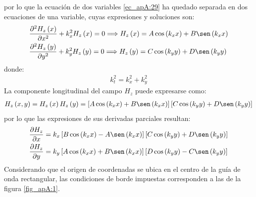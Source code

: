 por lo que la ecuación de dos variables \eqref{ec_apA:29} ha quedado separada en dos ecuaciones de una variable, cuyas expresiones y soluciones son:
\begin{subequations}
\label{grup_ec_apA:8}
\begin{align}
&\frac{\partial^2 H_z\left(x\right)}{\partial x^2} + k_x^2H_z\left(x\right) = 0\Longrightarrow H_z\left(x\right) = A\cos\left(k_xx\right) + B\sen\left(k_xx\right)
\label{ec_apA:37}\\
&\frac{\partial^2 H_z\left(y\right)}{\partial y^2} + k_y^2H_z\left(y\right) = 0\Longrightarrow H_z\left(y\right) = C\cos\left(k_yy\right) + D\sen\left(k_yy\right)
\label{ec_apA:38}
\end{align}
\end{subequations}
donde:
\begin{align}
k^2_t = k^2_x + k^2_y
\label{ec_apA:39}
\end{align}
La componente longitudinal del campo $H_z$ puede expresarse como:
\begin{align}
H_z\left(x,y\right) = H_z\left(x\right)H_z\left(y\right) = \left[A\cos\left(k_xx\right) + B\sen\left(k_xx\right)\right]\left[ C\cos\left(k_yy\right) + D\sen\left(k_yy\right)\right]
\label{ec_apA:40}
\end{align}
por lo que las expresiones de sus derivadas parciales resultan:
\begin{subequations}
\label{grup_ec_apA:9}
\begin{align}
\frac{\partial H_z}{\partial x} &= k_x\left[B\cos\left(k_xx\right) - A\sen\left(k_xx\right)\right]\left[C\cos\left(k_yy\right) + D\sen\left(k_yy\right)\right]
\label{ec_apA:41}\\
\frac{\partial H_z}{\partial y} &= k_y\left[A\cos\left(k_xx\right) + B\sen\left(k_xx\right)\right]\left[D\cos\left(k_yy\right) - C\sen\left(k_yy\right)\right]
\label{ec_apA:42}
\end{align}
\end{subequations}
Considerando que el origen de coordenadas se ubica en el centro de la guía de onda rectangular, las condiciones de borde impuestas corresponden a las de la figura \ref{fig_apA:1}.

